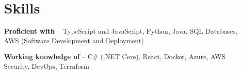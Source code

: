 \documentclass[letterpaper,10pt]{article}
\begin{document}
\section{Skills}
 \begin{itemize}[leftmargin=0.15in, label={}]
    \small{\item{
        \textbf{Proficient with} -- TypeScript and JavaScript, Python, Java, SQL Databases, AWS (Software Development and Deployment)
    }}
    \small{\item{
        \textbf{Working knowledge of} -- C\# (.NET Core), React, Docker, Azure, AWS Security, DevOps, Terraform
    }}
 \end{itemize}
\end{document}

